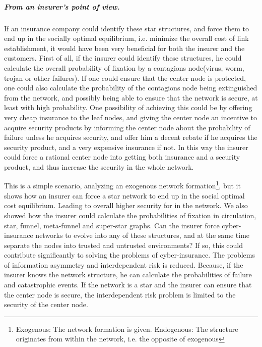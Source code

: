 \subparagraph{From an insurer's point of view.}
If an insurance company could identify these star structures, and force them to end up in the socially optimal equilibrium, i.e. minimize the overall cost of link establishment, it would have been very beneficial for both the insurer and the customers.
First of all, if the insurer could identify these structures, he could calculate the overall probability of fixation by a contagions node(virus, worm, trojan or other failures). If one could ensure that the center node is protected, one could also calculate the probability of the contagions node being extinguished from the network, and possibly being able to ensure that the network is secure, at least with high probability. 
One possibility of achieving this could be by offering very cheap insurance to the leaf nodes, and giving the center node an incentive to acquire security products by informing the center node about the probability of failure unless he acquires security, and offer him a decent rebate if he acquires the security product, and a very expensive insurance if not. In this way the insurer could force a rational center node into getting both insurance and a security product, and thus increase the security in the whole network.

This is a simple scenario, analyzing an exogenous network formation\footnote{Exogenous: The network formation is given. Endogenous: The structure originates from within the network, i.e. the opposite of exogenous}, but it shows how an insurer can force a star network to end up in the social optimal cost equilibrium. Leading to overall higher security for in the network. We also showed how the insurer could calculate the probabilities of fixation in circulation, star, funnel, meta-funnel and super-star graphs.  Can the insurer force cyber-insurance networks to evolve into any of these structures, and at the same time separate the nodes into trusted and untrusted environments? 
If so, this could contribute significantly to solving the problems of cyber-insurance. The problems of information asymmetry and interdependent risk is reduced. Because, if the insurer knows the network structure, he can calculate the probabilities of failure and catastrophic events. If the network is a star and the insurer can ensure that the center node is secure, the interdependent risk problem is limited to the security of the center node.


